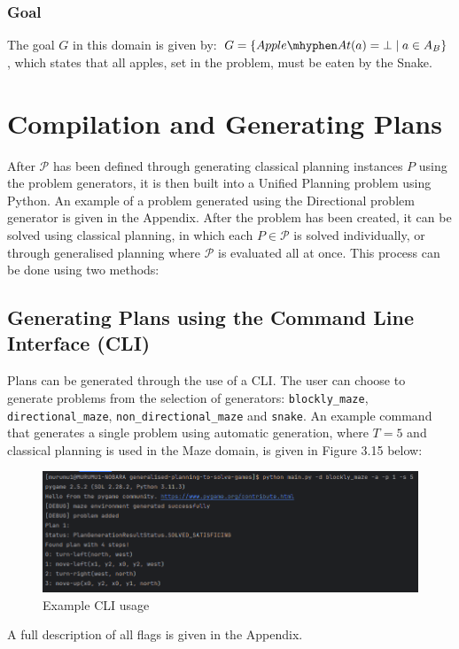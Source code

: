 \subsubsection{Goal}
The goal $G$ in this domain is given by: $G = \{Apple\mhyphen At(a) = \bot \mid a \in A_B\}$, which states that all apples, set in the problem, must be eaten by the Snake.

\newpage 
\section{Compilation and Generating Plans}
After $\mathcal{P}$ has been defined through generating classical planning instances $P$ using the problem generators, it is then built into a Unified Planning problem using Python. An example of a problem generated using the Directional problem generator is given in the Appendix. After the problem has been created, it can be solved using classical planning, in which each $P \in \mathcal{P}$ is solved individually, or through generalised planning where $\mathcal{P}$ is evaluated all at once. This process can be done using two methods:

\subsection{Generating Plans using the Command Line Interface (CLI)}
Plans can be generated through the use of a CLI. The user can choose to generate problems from the selection of generators: \texttt{blockly\_maze}, \texttt{directional\_maze}, \texttt{non\_directional\_maze} and \texttt{snake}. An example command that generates a single problem using automatic generation, where $T=5$ and classical planning is used in the Maze domain, is given in Figure 3.15 below:

\begin{figure}[h!]
    \centering
    \includegraphics[width=\textwidth]{images/terminalexample.png}
    \caption{Example CLI usage}
\end{figure}

\noindent A full description of all flags is given in the Appendix.


